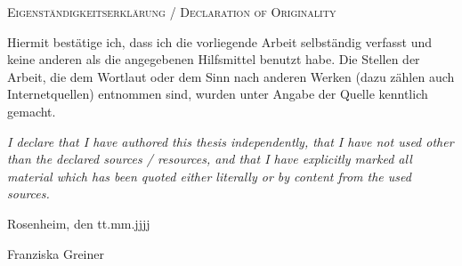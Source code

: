 \cleardoubleemptypage

{

\thispagestyle{empty}
\vspace*{\fill}

\noindent
\textsc{Eigenständigkeitserklärung / Declaration of Originality}

\medskip

\noindent
Hiermit bestätige ich, dass ich die vorliegende Arbeit selbständig verfasst und keine anderen als die angegebenen Hilfsmittel benutzt habe. Die Stellen der Arbeit, die dem Wortlaut oder dem Sinn nach anderen Werken (dazu zählen auch Internetquellen) entnommen sind, wurden unter Angabe der Quelle kenntlich gemacht.

\medskip

\textit{I declare that I have authored this thesis independently, that I have not used other than the declared sources / resources, and that I have explicitly marked all material which has been quoted either literally or by content from the used sources.}

\bigskip

\noindent
Rosenheim, den tt.mm.jjjj

\vspace*{2cm}

\noindent
Franziska Greiner
}

